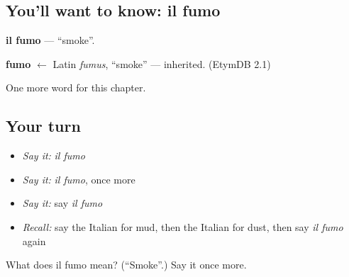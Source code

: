 \subsection*{You'll want to know: il fumo}
\textbf{il fumo} — \textquotedblleft{}smoke\textquotedblright{}.

\begin{cousinweb}
\textbf{fumo} $\leftarrow$ Latin \emph{fumus}, \textquotedblleft{}smoke\textquotedblright{} — inherited. (EtymDB 2.1)
\end{cousinweb}

\begin{grammarlens}[title={What you've built}]
One more word for this chapter.
\end{grammarlens}

\subsection*{Your turn}
\begin{itemize}
\raggedright
  \item \emph{Say it:} \emph{il fumo}
  \item \emph{Say it:} \emph{il fumo}, once more
  \item \emph{Say it:} say \emph{il fumo}
  \item \emph{Recall:} say the Italian for mud, then the Italian for dust, then say \emph{il fumo} again
\end{itemize}

\begin{tcolorbox}[breakable,colback=teal!4,colframe=teal!35!black,title={Before you move on}]
What does il fumo mean? (\textquotedblleft{}Smoke\textquotedblright{}.) Say it once more.
\end{tcolorbox}
